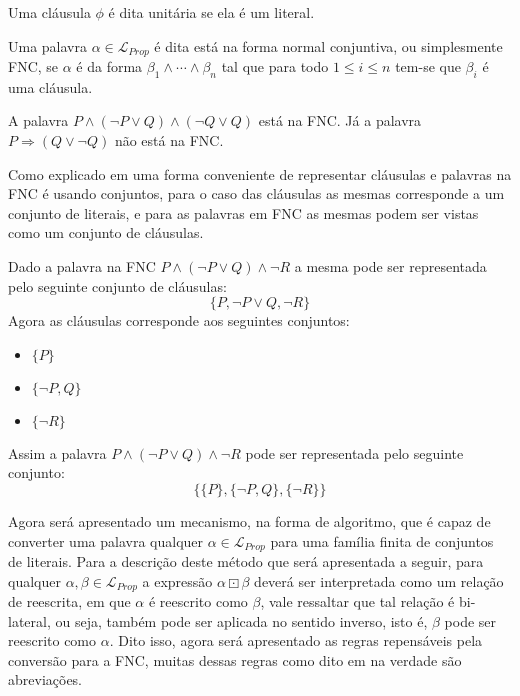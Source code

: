 \begin{definition}\label{def:cláusulaUnitaria}
    Uma cláusula $\phi$ é dita unitária se ela é um literal. 
\end{definition}

\begin{definition}\label{def:FNC}
    Uma palavra $\alpha \in \mathcal{L}_{Prop}$ é dita está na forma normal conjuntiva, ou simplesmente FNC, se $\alpha$ é da forma $\beta_1 \land \cdots \land \beta_n$ tal que para todo $1 \leq i \leq n$ tem-se que $\beta_i$ é uma cláusula.
\end{definition}

\begin{exem}
    A palavra $P \land (\neg P \lor Q) \land (\neg Q \lor Q)$ está na FNC. Já a palavra $P \Rightarrow (Q \lor \neg Q)$ não está na FNC.
\end{exem}

Como explicado em \cite{joaoPavao2014} uma forma conveniente de representar cláusulas e palavras na FNC é usando conjuntos, para o caso das cláusulas as mesmas corresponde a um conjunto de literais, e para as palavras em FNC as mesmas podem ser vistas como um conjunto de cláusulas.

\begin{exem}
    Dado a palavra na FNC $P \land (\neg P \lor Q) \land \neg R$ a mesma pode ser representada pelo seguinte conjunto de cláusulas:
    $$\{P, \neg P \lor Q, \neg R \}$$
    Agora as cláusulas corresponde aos seguintes conjuntos:
    \begin{itemize}
        \item $\{P\}$
        \item $\{\neg P, Q\}$
        \item $\{\neg R\}$
    \end{itemize}
    Assim a palavra $P \land (\neg P \lor Q) \land \neg R$ pode ser representada pelo seguinte conjunto:
    $$\{\{P\}, \{\neg P, Q\}, \{\neg R\}\}$$
\end{exem}

Agora será apresentado um mecanismo, na forma de algoritmo, que é capaz de converter uma palavra qualquer $\alpha \in \mathcal{L}_{Prop}$ para uma família finita de conjuntos de literais. Para a descrição deste método que será apresentada a seguir, para qualquer $\alpha, \beta \in \mathcal{L}_{Prop}$ a expressão $\alpha \boxdot \beta$ deverá ser interpretada como um relação de reescrita, em que $\alpha$ é reescrito como $\beta$, vale ressaltar que tal relação é bi-lateral, ou seja, também pode ser aplicada no sentido inverso, isto é, $\beta$ pode ser reescrito como $\alpha$. Dito isso, agora será apresentado as regras repensáveis pela conversão para a FNC, muitas dessas regras como dito em \cite{joaoPavao2014} na verdade são abreviações.

